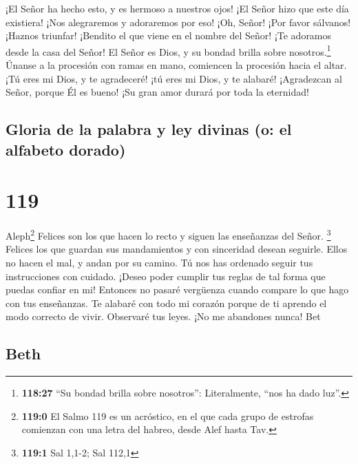  ¡El Señor ha hecho esto, y es hermoso a nuestros ojos!
 ¡El Señor hizo que este día existiera! ¡Nos alegraremos
y adoraremos por eso!  ¡Oh, Señor! ¡Por favor sálvanos!
¡Haznos triunfar!  ¡Bendito el que viene en el nombre del
Señor! ¡Te adoramos desde la casa del Señor!  El Señor es
Dios, y su bondad brilla sobre nosotros.\footnote{\textbf{118:27} ``Su
  bondad brilla sobre nosotros'': Literalmente, ``nos ha dado luz''.}
Únanse a la procesión con ramas en mano, comiencen la procesión hacia el
altar.  ¡Tú eres mi Dios, y te agradeceré! ¡tú eres mi
Dios, y te alabaré!  ¡Agradezcan al Señor, porque Él es
bueno! ¡Su gran amor durará por toda la eternidad!

\hypertarget{gloria-de-la-palabra-y-ley-divinas-o-el-alfabeto-dorado}{%
\subsection{Gloria de la palabra y ley divinas (o: el alfabeto
dorado)}\label{gloria-de-la-palabra-y-ley-divinas-o-el-alfabeto-dorado}}

\hypertarget{section-118}{%
\section{119}\label{section-118}}

Aleph\footnote{\textbf{119:0} El Salmo 119 es un acróstico, en el que
  cada grupo de estrofas comienzan con una letra del habreo, desde Alef
  hasta Tav.}  Felices son los que hacen lo recto y siguen
las enseñanzas del Señor. \footnote{\textbf{119:1} Sal 1,1-2; Sal 112,1}
 Felices los que guardan sus mandamientos y con sinceridad
desean seguirle.  Ellos no hacen el mal, y andan por su
camino.  Tú nos has ordenado seguir tus instrucciones con
cuidado.  ¡Deseo poder cumplir tus reglas de tal forma que
puedas confiar en mi!  Entonces no pasaré vergüenza cuando
compare lo que hago con tus enseñanzas.  Te alabaré con
todo mi corazón porque de ti aprendo el modo correcto de vivir.
 Observaré tus leyes. ¡No me abandones nunca! Bet

\hypertarget{beth}{%
\subsection{Beth}\label{beth}}

